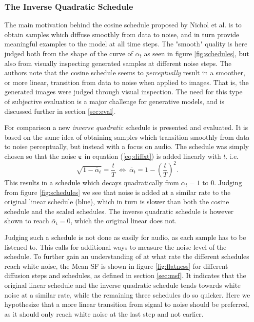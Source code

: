 \documentclass{report}
\begin{document}
\subsubsection{The Inverse Quadratic Schedule} \label{sec:invquad}
The main motivation behind the cosine schedule proposed by Nichol et al. \cite{nichol2021improved} is to obtain samples which diffuse smoothly from data to noise, and in turn provide meaningful examples to the model at all time steps. The "smooth" quality is here judged both from the shape of the curve of $\bar{\alpha}_t$ as seen in figure \ref{fig:schedules}, but also from visually inspecting generated samples at different noise steps. The authors note that the cosine schedule seems to \textit{perceptually} result in a smoother, or more linear, transition from data to noise when applied to images. That is, the generated images were judged through visual inspection. The need for this type of subjective evaluation is a major challenge for generative models, and is discussed further in section \ref{sec:eval}.

For comparison a new \textit{inverse quadratic} schedule is presented and evaluated. It is based on the same idea of obtaining samples which transition smoothly from data to noise perceptually, but instead with a focus on audio. The schedule was simply chosen so that the noise $\bm{\varepsilon}$ in equation (\ref{eq:diffxt}) is added linearly with $t$, i.e.
\begin{equation}
    \sqrt{1-\bar{\alpha}_t} = \frac{t}{T} \ \Leftrightarrow \ \bar{\alpha}_t = 1-\left(\frac{t}{T}\right)^2.
\end{equation}
This results in a schedule which decays quadratically from $\bar{\alpha}_t = 1$ to $0$. Judging from figure \ref{fig:schedules} we see that noise is added at a similar rate to the original linear schedule (blue), which in turn is slower than both the cosine schedule and the scaled schedules. The inverse quadratic schedule is however shown to reach $\bar{\alpha}_t = 0$, which the original linear does not. 

Judging such a schedule is not done as easily for audio, as each sample has to be listened to. This calls for additional ways to measure the noise level of the schedule. To further gain an understanding of at what rate the different schedules reach white noise, the Mean SF is shown in figure \ref{fig:flatness} for different diffusion steps and schedules, as defined in section \ref{sec:msf}. It indicates that the original linear schedule and the inverse quadratic schedule tends towards white noise at a similar rate, while the remaining three schedules do so quicker. Here we hypothesize that a more linear transition from signal to noise should be preferred, as it should only reach white noise at the last step and not earlier.
\end{document}

